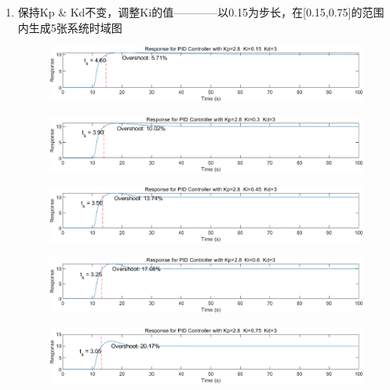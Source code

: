 \documentclass{thuemp}
\begin{document}
\begin{enumerate}
  \item 保持Kp \& Kd不变，调整Ki的值————以0.15为步长，在[0.15,0.75]的范围内生成5张系统时域图
  \begin{figure}[H]
    \centering
    \includegraphics[width=1\linewidth]{./img/PID/pd1.png}
  \end{figure}
  \begin{figure}[H]
    \centering
    \includegraphics[width=1\linewidth]{./img/PID/pd2.png}
  \end{figure}
  \begin{figure}[H]
    \centering
    \includegraphics[width=1\linewidth]{./img/PID/pd3.png}
  \end{figure}
  \begin{figure}[H]
    \centering
    \includegraphics[width=1\linewidth]{./img/PID/pd4.png}
  \end{figure}
  \begin{figure}[H]
    \centering
    \includegraphics[width=1\linewidth]{./img/PID/pd5.png}
  \end{figure}


\end{enumerate}
\end{document}
